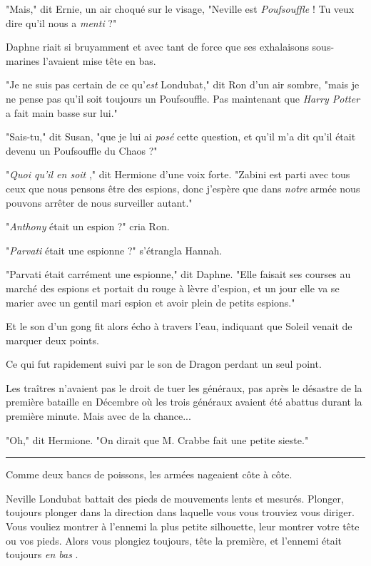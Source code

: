 "Mais," dit Ernie, un air choqué sur le visage, "Neville est \emph{Poufsouffle}  ! Tu veux dire qu'il nous a \emph{menti}  ?"

Daphne riait si bruyamment et avec tant de force que ses exhalaisons sous-marines l'avaient mise tête en bas.

"Je ne suis pas certain de ce qu'\emph{est}  Londubat," dit Ron d'un air sombre, "mais je ne pense pas qu'il soit toujours un Poufsouffle. Pas maintenant que \emph{Harry Potter}  a fait main basse sur lui."

"Sais-tu," dit Susan, "que je lui ai \emph{posé } cette question, et qu'il m'a dit qu'il était devenu un Poufsouffle du Chaos ?"

"\emph{Quoi qu'il en soit} ," dit Hermione d'une voix forte. "Zabini est parti avec tous ceux que nous pensons être des espions, donc j'espère que dans \emph{notre}  armée nous pouvons arrêter de nous surveiller autant."

"\emph{Anthony}  était un espion ?" cria Ron.

"\emph{Parvati}  était une espionne ?" s'étrangla Hannah.

"Parvati était carrément une espionne," dit Daphne. "Elle faisait ses courses au marché des espions et portait du rouge à lèvre d'espion, et un jour elle va se marier avec un gentil mari espion et avoir plein de petits espions."

Et le son d'un gong fit alors écho à travers l'eau, indiquant que Soleil venait de marquer deux points.

Ce qui fut rapidement suivi par le son de Dragon perdant un seul point.

Les traîtres n'avaient pas le droit de tuer les généraux, pas après le désastre de la première bataille en Décembre où les trois généraux avaient été abattus durant la première minute. Mais avec de la chance...

"Oh," dit Hermione. "On dirait que M. Crabbe fait une petite sieste."
\par\noindent\rule{\textwidth}{0.4pt}
Comme deux bancs de poissons, les armées nageaient côte à côte.

Neville Londubat battait des pieds de mouvements lents et mesurés. Plonger, toujours plonger dans la direction dans laquelle vous vous trouviez vous diriger. Vous vouliez montrer à l'ennemi la plus petite silhouette, leur montrer votre tête ou vos pieds. Alors vous plongiez toujours, tête la première, et l'ennemi était toujours \emph{en bas} .

